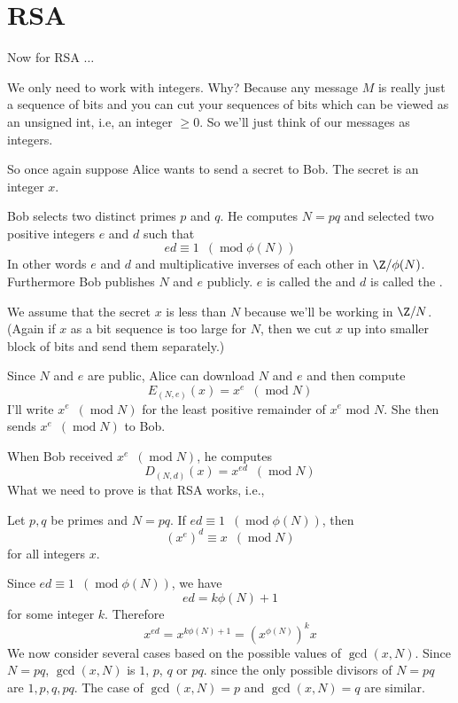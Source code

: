 \section{RSA}

Now for RSA $\ldots$

We only need to work with integers. Why? Because any message $M$ is
really just a sequence of bits and you can cut your sequences of
bits which can be viewed as an unsigned int, i.e, an integer $\geq 0$.
So we'll just think of our messages as integers.

So once again suppose Alice wants to send a secret to Bob. The
secret is an integer $x$.

Bob selects two distinct primes $p$ and $q$.
He computes $N = pq$ and selected two positive integers $e$ and $d$
such that
\[
 ed \equiv 1 \,\,\,(\operatorname{mod} \phi(N))
\]
In other words $e$ and $d$ and multiplicative inverses of each
other in $\Z/\phi(N)$.
Furthermore Bob publishes $N$ and $e$ publicly.
$e$ is called the 
and
$d$ is called the .

We assume that the secret $x$ is less than $N$
because we'll be working in $\Z/N$.
(Again if $x$ as a bit sequence is too large for $N$,
then we cut $x$ up into smaller block of bits and send them
separately.)

Since $N$ and $e$ are public, Alice can download $N$ and $e$
and then compute
\[
E_{(N,e)}(x) = x^e \,\,\,(\operatorname{mod} N)
\]
I'll write $x^e \,\,\,(\operatorname{mod} N)$ for the 
least positive remainder of $x^e$ mod $N$.
She then sends $x^e \,\,\,(\operatorname{mod} N)$ to Bob.

When Bob received $x^e \,\,\,(\operatorname{mod} N)$, he computes
\[
D_{(N,d)}(x) = x^{ed} \,\,\,(\operatorname{mod} N)
\]
What we need to prove is that RSA works, i.e.,


\begin{thm}
  Let $p,q$ be primes and $N = pq$.
  If $ed \equiv 1 \,\,\,(\operatorname{mod} \phi(N))$,
  then
  \[
  (x^e)^d \equiv x \,\,\,(\operatorname{mod} N)
  \]
  for all integers $x$.
\end{thm}

\proof
Since $ed \equiv 1 \,\,\,(\operatorname{mod} \phi(N))$, we have
\[
 ed = k \phi(N) + 1
\]
for some integer $k$. Therefore
\[
x^{ed} = x^{k\phi(N) + 1} = (x^{\phi(N)})^k x
\]
We now consider several cases based on the possible values
of $\gcd(x, N)$.
Since $N = pq$, $\gcd(x, N)$ is $1$, $p$, $q$ or $pq$.
since the only possible divisors of $N=pq$ are $1,p,q,pq$.
The case of
$\gcd(x, N) = p$
and
$\gcd(x, N) = q$
are similar.

